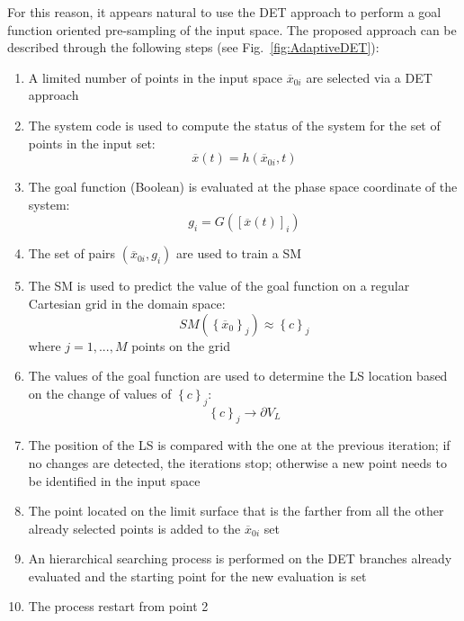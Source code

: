 \documentclass{anstrans}
\begin{document}
For this reason, it appears natural to use the DET approach to perform a goal function oriented pre-sampling of the input space. The proposed approach can be described through the following steps (see Fig.~\ref{fig:AdaptiveDET}):
\begin{enumerate} 
\item A limited number of points in the input space $\overline{x}_{0i}$ are selected via a DET approach
\item The system code is used to compute the status of the system for the set of points in the input set:
\begin{equation}
    \overline{x}(t)=h(\overline{x}_{0i},t)
\end{equation}
\item The goal function (Boolean) is evaluated at the phase space coordinate of the system: 
\begin{equation}
g_{i}=G([\overline{x}(t)]_{i})
\end{equation}
\item The set of pairs $(\overline{x}_{0i},g_{i})$ are used to train a SM
\item The SM is used to predict the value of the goal function on a regular Cartesian grid in the domain space:
\begin{equation}
SM\left ( \left \{ \overline{x}_{0} \right \}_{j} \right ) \approx \left \{ c \right \}_{j}
\end{equation}
where $j=1, ..., M$ points on the grid 
\item The values of the goal function are used to determine the LS location based on the change of values of $\left \{ c \right \}_{j}$:
\begin{equation}
\left \{ c \right \}_{j} \rightarrow \partial V_{L}
\end{equation}
\item The position of the LS is compared with the one at the previous iteration; if no changes are detected, the iterations stop; otherwise a new point needs to be identified in the input space
\item The point located on the limit surface that is the farther from all the other already selected points is added to the $\overline{x}_{0i}$ set 
\item An hierarchical searching process is performed on the DET branches already evaluated and the starting point for the new evaluation is set
\item The process restart from point 2
\end{enumerate}
\end{document}
